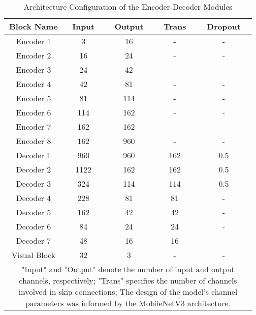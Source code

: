 \documentclass[a4paper, times, 10pt,twocolumn]{article}
\begin{document}
\begin{table}[h]
	\caption{Architecture Configuration of the Encoder-Decoder Modules}
	\label{tab:encoder_decoder_setting}
	\begin{tabular}{ccccc}
		\hline
		Block Name   & Input & Output & Trans & Dropout \\
		\hline
		Encoder 1    & 3     & 16     & -     & -       \\
		Encoder 2    & 16    & 24     & -     & -       \\
		Encoder 3    & 24    & 42     & -     & -       \\
		Encoder 4    & 42    & 81     & -     & -       \\
		Encoder 5    & 81    & 114    & -     & -       \\
		Encoder 6    & 114   & 162    & -     & -       \\
		Encoder 7    & 162   & 162    & -     & -       \\
		Encoder 8    & 162   & 960    & -     & -       \\
		Decoder 1    & 960   & 960    & 162   & 0.5     \\
		Decoder 2    & 1122  & 162    & 162   & 0.5     \\
		Decoder 3    & 324   & 114    & 114   & 0.5     \\
		Decoder 4    & 228   & 81     & 81    & -       \\
		Decoder 5    & 162   & 42     & 42    & -       \\
		Decoder 6    & 84    & 24     & 24    & -       \\
		Decoder 7    & 48    & 16     & 16    & -       \\
		Visual Block & 32    & 3      & -     & -       \\
		\hline
		\multicolumn{5}{p{244pt}}{"Input" and "Output" denote the number of input and output channels, respectively; "Trans" specifies the number of channels involved in skip connections; The design of the model’s channel parameters was informed by the MobileNetV3 architecture\cite{howard_searching_2019}.}
	\end{tabular}
\end{table}
\end{document}
